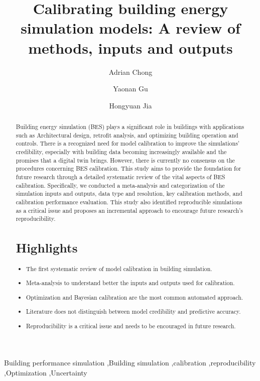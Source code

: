 \documentclass[review]{elsarticle}
\begin{document}
\begin{frontmatter}

\title{Calibrating building energy simulation models: A review of methods, inputs and outputs}


\author[add1]{Adrian Chong}
\author[add1]{Yaonan Gu}
\author[add2]{Hongyuan Jia}

\address[add1]{Department of Building, School of Design and Environment, National University of Singapore, 4 Architecture Drive, Singapore 117566, Singapore}
\address[add2]{SinBerBEST Program, Berkeley Education Alliance for Research in Singapore, Singapore, 138602, Singapore}


\begin{abstract}
Building energy simulation (BES) plays a significant role in buildings with applications such as Architectural design, retrofit analysis, and optimizing building operation and controls. There is a recognized need for model calibration to improve the simulations' credibility, especially with building data becoming increasingly available and the promises that a digital twin brings. However, there is currently no consensus on the procedures concerning BES calibration. This study aims to provide the foundation for future research through a detailed systematic review of the vital aspects of BES calibration. Specifically, we conducted a meta-analysis and categorization of the simulation inputs and outputs, data type and resolution, key calibration methods, and calibration performance evaluation. This study also identified reproducible simulations as a critical issue and proposes an incremental approach to encourage future research's reproducibility. 

\section*{Highlights}
\begin{itemize}
    \item The first systematic review of model calibration in building simulation.
    \item Meta-analysis to understand better the inputs and outputs used for calibration. 
    \item Optimization and Bayesian calibration are the most common automated approach.
    \item Literature does not distinguish between model credibility and predictive accuracy.
    \item Reproducibility is a critical issue and needs to be encouraged in future research.
\end{itemize}

\end{abstract}
\begin{keyword}
Building performance simulation \sep Building simulation \sep calibration \sep reproducibility \sep Optimization \sep Uncertainty
\end{keyword}

\end{frontmatter}
\end{document}
